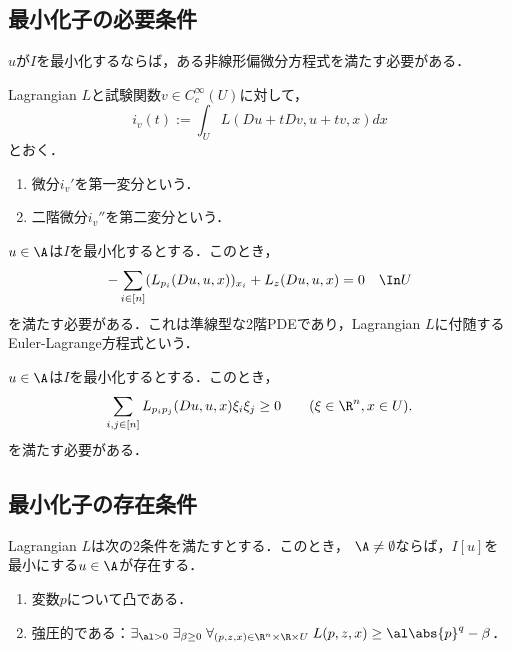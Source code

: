 \documentclass[uplatex,dvipdfmx]{jsreport}
\begin{document}
\subsection{最小化子の必要条件}

\begin{tcolorbox}[colframe=ForestGreen, colback=ForestGreen!10!white,breakable,colbacktitle=ForestGreen!40!white,coltitle=black,fonttitle=\bfseries\sffamily,
title=]
    $u$が$I$を最小化するならば，ある非線形偏微分方程式を満たす必要がある．
\end{tcolorbox}

\begin{definition}
    Lagrangian $L$と試験関数$v\in C^\infty_c(U)$に対して，
    \[i_v(t):=\int_UL(Du+tDv,u+tv,x)dx\]
    とおく．
    \begin{enumerate}
        \item 微分$i_v'$を第一変分という．
        \item 二階微分$i_v''$を第二変分という．
    \end{enumerate}
\end{definition}

\begin{proposition}
    $u\in\A$は$I$を最小化するとする．このとき，
    \[-\sum_{i\in[n]}(L_{p_i}(Du,u,x))_{x_i}+L_z(Du,u,x)=0\quad\In U\]
    を満たす必要がある．これは準線型な2階PDEであり，Lagrangian $L$に付随するEuler-Lagrange方程式という．
\end{proposition}

\begin{proposition}[第一変分が正であるための条件]
    $u\in\A$は$I$を最小化するとする．このとき，
    \[\sum_{i,j\in[n]}L_{p_ip_j}(Du,u,x)\xi_i\xi_j\ge0\qquad(\xi\in\R^n,x\in U).\]
    を満たす必要がある．
\end{proposition}

\subsection{最小化子の存在条件}

\begin{theorem}
    Lagrangian $L$は次の2条件を満たすとする．このとき，
    $\A\ne\emptyset$ならば，$I[u]$を最小にする$u\in\A$が存在する．
    \begin{enumerate}
        \item 変数$p$について凸である．
        \item 強圧的である：$\exists_{\al>0}\;\exists_{\beta\ge0}\;\forall_{(p,z,x)\in\R^n\times\R\times U}\;L(p,z,x)\ge\al\abs{p}^q-\beta$．
    \end{enumerate}
\end{theorem}
\end{document}
